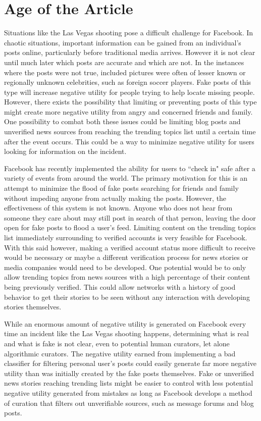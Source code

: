 \documentclass[12pt]{article}
\begin{document}
\section{Age of the Article}

Situations like the Las Vegas shooting pose a difficult challenge for Facebook. In chaotic situations, important information can be gained from an individual's posts online, particularly before traditional media arrives. However it is not clear until much later which posts are accurate and which are not. In the instances where the posts were not true, included pictures were often of lesser known or regionally unknown celebrities, such as foreign soccer players. Fake posts of this type will increase negative utility for people trying to help locate missing people. However, there exists the possibility that limiting or preventing posts of this type might create more negative utility from angry and concerned friends and family. One possibility to combat both these issues could be limiting blog posts and unverified news sources from reaching the trending topics list until a certain time after the event occurs. This could be a way to minimize negative utility for users looking for information on the incident.

Facebook has recently implemented the ability for users to ``check in" safe after a variety of events from around the world. The primary motivation for this is an attempt to minimize the flood of fake posts searching for friends and family without impeding anyone from actually making the posts. However, the effectiveness of this system is not known. Anyone who does not hear from someone they care about may still post in search of that person, leaving the door open for fake posts to flood a user's feed. Limiting content on the trending topics list immediately surrounding to verified accounts is very feasible for Facebook. With this said however, making a verified account status more difficult to receive would be necessary or maybe a different verification process for news stories or media companies would need to be developed. One potential would be to only allow trending topics from news sources with a high percentage of their content being previously verified. This could allow networks with a history of good behavior to get their stories to be seen without any interaction with developing stories themselves.

While an enormous amount of negative utility is generated on Facebook every time an incident like the Las Vegas shooting happens, determining what is real and what is fake is not clear, even to potential human curators, let alone algorithmic curators. The negative utility earned from implementing a bad classifier for filtering personal user's posts could easily generate far more negative utility than was initially created by the fake posts themselves. Fake or unverified news stories reaching trending lists might be easier to control with less potential negative utility generated from mistakes as long as Facebook develops a method of curation that filters out unverifiable sources, such as message forums and blog posts. 
\end{document}
